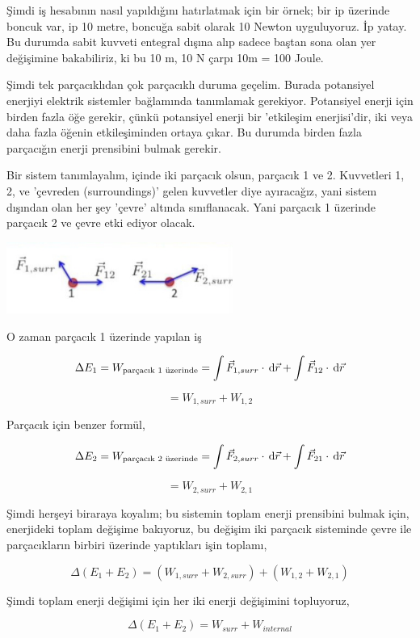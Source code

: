 \documentclass[12pt,fleqn]{article}\usepackage{../../common}
\begin{document}
Şimdi iş hesabının nasıl yapıldığını hatırlatmak için bir örnek; bir ip üzerinde
boncuk var, ip 10 metre, boncuğa sabit olarak 10 Newton uyguluyoruz. İp yatay. Bu
durumda sabit kuvveti entegral dışına alıp sadece baştan sona olan yer
değişimine bakabiliriz, ki bu 10 m, 10 N çarpı 10m = 100 Joule.

Şimdi tek parçacıklıdan çok parçacıklı duruma geçelim. Burada potansiyel
enerjiyi elektrik sistemler bağlamında tanımlamak gerekiyor. Potansiyel enerji
için birden fazla öğe gerekir, çünkü potansiyel enerji bir 'etkileşim
enerjisi'dir, iki veya daha fazla öğenin etkileşiminden ortaya çıkar. Bu durumda
birden fazla parçacığın enerji prensibini bulmak gerekir.

Bir sistem tanımlayalım, içinde iki parçacık olsun, parçacık 1 ve 2. Kuvvetleri
1, 2, ve 'çevreden (surroundings)' gelen kuvvetler diye ayıracağız, yani sistem
dışından olan her şey 'çevre' altında sınıflanacak. Yani parçacık 1 üzerinde
parçacık 2 ve çevre etki ediyor olacak. 

\includegraphics[width=20em]{08_01.jpg}

O zaman parçacık 1 üzerinde yapılan iş

$$
\Delta E_1 =
W_{\textrm{\textrm{parçacık 1 üzerinde}}} =
\int \vec{F}_{1,surr} \cdot \,\mathrm{d} \vec{r} +
\int \vec{F}_{12} \cdot \,\mathrm{d} \vec{r}
$$

$$
= W_{1, surr} + W_{1,2}
$$

Parçacık için benzer formül,

$$
\Delta E_2 =
W_{\textrm{\textrm{parçacık 2 üzerinde}}} =
\int \vec{F}_{2,surr} \cdot \,\mathrm{d} \vec{r} +
\int \vec{F}_{21} \cdot \,\mathrm{d} \vec{r}
$$

$$
= W_{2, surr} + W_{2,1}
$$

Şimdi herşeyi biraraya koyalım; bu sistemin toplam enerji prensibini bulmak
için, enerjideki toplam değişime bakıyoruz, bu değişim iki parçacık sisteminde
çevre ile parçacıkların birbiri üzerinde yaptıkları işin toplamı,

$$
\Delta (E_1 + E_2) = (W_{1, surr} + W_{2, surr}) + (W_{1,2} + W_{2,1})
$$

Şimdi toplam enerji değişimi için her iki enerji değişimini topluyoruz,

$$
\Delta (E_1 + E_2) = W_{surr} + W_{internal} 
$$
\end{document}
